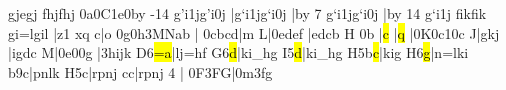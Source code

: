 {}gjegj\relax
\barre\motif fhjfhj\relax
\barre\notes\ibu0a0\boqh C\ibu1e0{\advance\transpose by -14\relax
\zq g\rq i\qh1j\zq g\rq i\qh0j}\enotes
{}\enotes
\notes|\zq g\lq i\qb1j\zq g\lq i\qb0j\enotes
\notes|{\advance\transpose by 7\relax
\zq g\lq i\qb1j\zq g\lq i\qb0j}\enotes
\notes|{\advance\transpose by 14\relax
{}\zq g\lq i\qb1j}\enotes
\barre\motif fikfik\relax
\barre\motif gi{=l}gil\relax
\generalmeter{\allabreve}\changecontext
%
\NOtes|\octfin z1\relax
\sforz x\hu q\enotes
\temps\NOtes\pointdorgue c\hpause|\pointdorgue o\hpause\enotes
\relax\alaligne
\notes{}%
\ifx\mxversion\undefined\Ilegu0g\else\isluru0h\fi\qqh3MNab\relax
|\enotes
\temps\notes\qqb0cbcd|\hu m\enotes
{}\relax
\barre\notes
   \bohu L|\qqb0edef\enotes
\temps\notes|edcb\enotes
\barre\Notes\bohu H\ifx\mxversion\undefined{}\relax
                    \else\tslur0b\relax
                    \fi|\hl c\enotes
\temps\notes|\Interligne\rlap{\soupir}\hl q\enotes
\temps\notes|\Ilegl0K\ibl0c1\tqb0c\enotes
\barre\notes\bohu J|gkj\enotes
\temps\notes|igdc\enotes
\barre\notes\bohl M|\ibl0e0\tqb0g\enotes
\temps\notes|\qqb3hijk\enotes
\barre\Arpg D6\notes{}\hl{=a}|lj{=h}f\enotes
\temps\arpg G6\notes{}\hl d|ki{_h}g\enotes
\barre\arpg I5\notes{}\hl d|ki{_h}g\enotes
\temps\Arpg H5\notes{}\lh b\hl c|kig\enotes
\barre\Arpg H6\notes{}\hl g|n{=l}ki\enotes
\temps\Arpg  b{9}\notes\zh c|pnlk\enotes
\barre\Arpg H5\notes{}\bohl c|rpnj\enotes
\temps\notes{}\boql c\sk\boql c|rpnj\enotes
\barre{}4{\lppage}\relax\bigaccid
\ifx\mulooseness\undefined\else{}\fi
\notes{}\soupir|\soupir\enotes
\notes\ibbl0F3\soqb F\qs{}\soqb G\qs|\qs\ibbu0m3\soqh f\qs{}\soqh g\enotes
